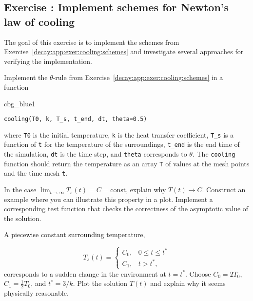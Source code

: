 \documentclass[graybox,sectrefs,envcountresetchap,open=right,final]{svmonodo}
\newenvironment{_cod_tight}[1]{
   \def\FrameCommand{\colorbox{#1}}
   \FrameRule0.6pt\MakeFramed {\FrameRestore}\vskip3mm}
   {\vskip0mm\endMakeFramed}
\newenvironment{cod}[1]{
\bgroup\rmfamily
\fboxsep=0mm\relax
\begin{_cod_tight}{#1}
\list{}{\parsep=-2mm\parskip=0mm\topsep=0pt\leftmargin=2mm
\rightmargin=2\leftmargin\leftmargin=4pt\relax}
\item\relax}
{\endlist\end{_cod_tight}\egroup}
\newenvironment{doconceexercise}{}{}
\newcounter{doconceexercisecounter}
\begin{document}
\begin{doconceexercise}

\subsection*{Exercise \thedoconceexercisecounter: Implement schemes for Newton's law of cooling}

\label{decay:app:exer:cooling:py}

The goal of this exercise is to implement the schemes from
Exercise~\ref{decay:app:exer:cooling:schemes} and investigate
several approaches for verifying the implementation.


Implement the $\theta$-rule from
Exercise~\ref{decay:app:exer:cooling:schemes} in a function

\begin{cod}{cbg_blue1}\begin{Verbatim}[numbers=none,fontsize=\fontsize{9pt}{9pt},baselinestretch=0.95,xleftmargin=2mm]
cooling(T0, k, T_s, t_end, dt, theta=0.5)
\end{Verbatim}
\end{cod}
\noindent
where \texttt{T0} is the initial temperature, \texttt{k} is
the heat transfer coefficient, \Verb!T_s! is a function of \texttt{t} for
the temperature of the
surroundings, \Verb!t_end! is the end time of the simulation, \texttt{dt} is the
time step, and \texttt{theta} corresponds to $\theta$.  The \texttt{cooling}
function should return the temperature as an array \texttt{T} of values at
the mesh points and the time mesh \texttt{t}.



In the case $\lim_{t\rightarrow\infty}T_s(t)=C=\mbox{const}$,
explain why $T(t)\rightarrow C$. Construct an example where you
can illustrate this property in a plot. Implement a corresponding
test function that checks the correctness of the asymptotic
value of the solution.



A piecewise constant surrounding temperature,

\[ T_s(t) = \left\lbrace\begin{array}{ll} C_0,& 0\leq t\leq t^*\\ 
C_1, & t>t^*,\end{array}\right.
\]
corresponds to a sudden change in the environment
at $t=t^*$. Choose $C_0=2T_0$, $C_1=\frac{1}{2}T_0$, and
$t^*=3/k$. Plot the solution $T(t)$ and explain why it seems physically
reasonable.



\end{doconceexercise}
\end{document}
